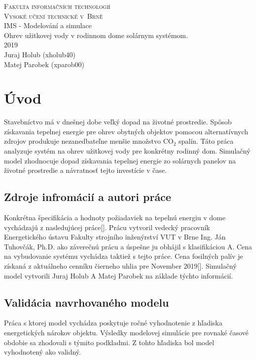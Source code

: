 \documentclass[a4paper, 11pt]{article}
\begin{document}
\begin{titlepage}
	\begin{center}
		\Huge
		\textsc{Fakulta informačních technologií \\
			Vysoké učení technické v~Brně} \\
		{\LARGE
			IMS - Modelování a simulace \\ 
			\medskip 
			\Large{
				Ohrev užitkovej vody v rodinnom dome solárnym systémom.
			}
			}
		\setlength{\parindent}{0.3em}\\
		{\Large 2019} \\
		{\Large Juraj Holub (xholub40)}\\
		{\Large Matej Parobek (xparob00)}
	\end{center}
\end{titlepage}

\tableofcontents
\newpage

\section{Úvod}
Stavebníctvo má v dnešnej dobe veľký dopad na životné prostredie. Spôsob získavania tepelnej energie pre ohrev obytných objektov pomocou alternatívnych zdrojov produkuje nezanedbateľne menšie množstvo CO$_2$ spalín. Táto práca analyzuje systém na ohrev užitkovej vody pre konkrétny rodinný dom. Simulačný model zhodnocuje dopad získavania tepelnej energie zo solárnych panelov na životné prostredie a návratnosť tejto investície v čase. 

\subsection{Zdroje infromácií a autori práce}
Konkrétna špecifikácia a hodnoty požiadaviek na tepelnú energiu v dome vychádzajú z nasledujúcej práce[]. Prácu vytvoril vedecký pracovník Energetického ústavu Fakulty strojního inženýrství VUT v Brne Ing. Ján Tuhovčák, Ph.D. ako záverečnú prácu a úspešne ju obhájil s klasifikáciou A. Cena na vybudovanie systému vychádza taktiež s tejto práce. Cena fosilných palív je získaná z aktuálneho cenníku čierneho uhlia pre November 2019[]. Simulačný model vytvorili Juraj Holub A Matej Parobek na základe týchto informácií. 

\subsection{Validácia navrhovaného modelu}
Práca s ktorej model vychádza poskytuje ročné vyhodnotenie z hľadiska energetických nárokov objektu. Výsledky modelovej simulácie pre rovnaké časové obdobie sa zhodovali s týmito podkladmi. Z tohto hľadiska bol model vyhodnotený ako validný.
\end{document}
